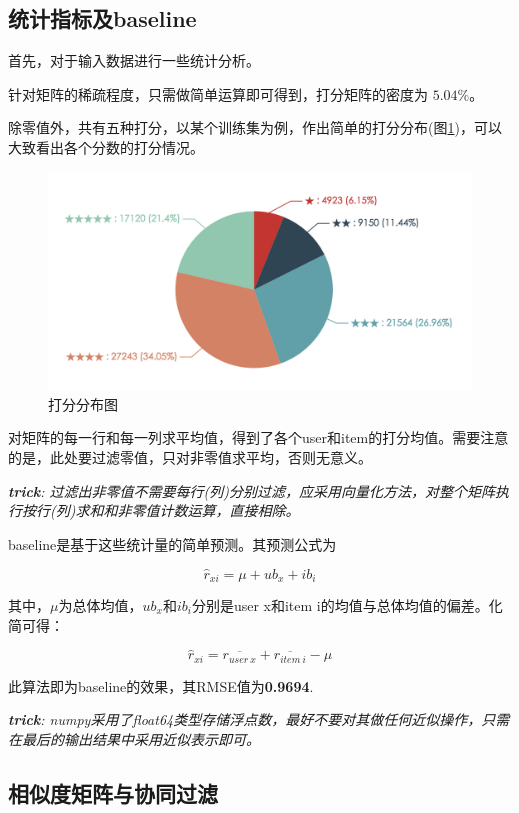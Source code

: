 \documentclass[utf8, a4paper, 11pt, onecolumn]{ctexart}
\begin{document}
\begin{spacing}{1.25}
\subsection{统计指标及baseline}

首先，对于输入数据进行一些统计分析。

针对矩阵的稀疏程度，只需做简单运算即可得到，打分矩阵的密度为 $5.04\%$。

除零值外，共有五种打分，以某个训练集为例，作出简单的打分分布(图\ref{rating-pie})，可以大致看出各个分数的打分情况。

\begin{figure}[h]
	\centering
	\includegraphics[width=1.0\linewidth]{rating-pie.png}
	\caption{打分分布图}
	\label{rating-pie}
\end{figure}

对矩阵的每一行和每一列求平均值，得到了各个user和item的打分均值。需要注意的是，此处要过滤零值，只对非零值求平均，否则无意义。

\textit{\textbf{trick}: 过滤出非零值不需要每行(列)分别过滤，应采用向量化方法，对整个矩阵执行按行(列)求和和非零值计数运算，直接相除。}

baseline是基于这些统计量的简单预测。其预测公式为

\[\hat{r}_{xi} = \mu + ub_{x} + ib_{i}\]

其中，$\mu$为总体均值，$ub_{x}$和$ib_{i}$分别是user x和item i的均值与总体均值的偏差。化简可得：

\[\hat{r}_{xi} = \overline{r_{user\ x}}+ \overline{r_{item\ i}} - \mu\]

此算法即为baseline的效果，其RMSE值为\textbf{0.9694}.

\textit{\textbf{trick}: numpy采用了float64类型存储浮点数，最好不要对其做任何近似操作，只需在最后的输出结果中采用近似表示即可。}

\subsection{相似度矩阵与协同过滤}


\end{spacing}
\end{document}
